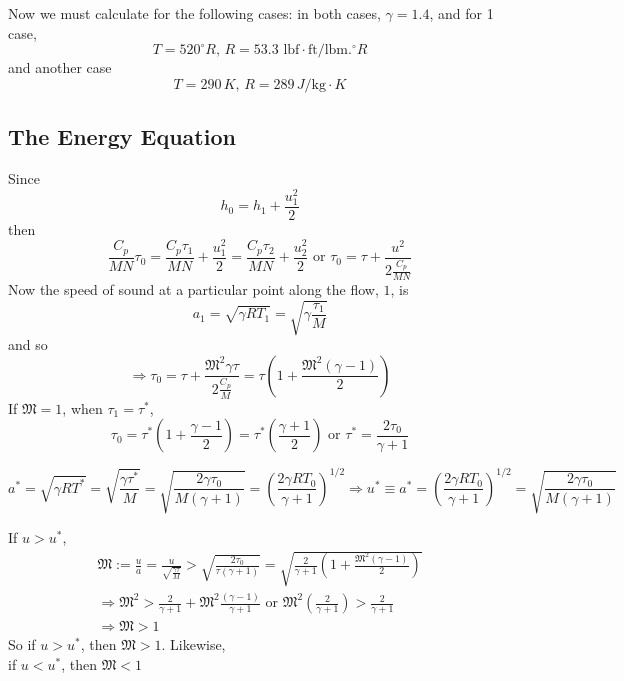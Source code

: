 \documentclass[twoside,landscape,10pt]{amsart}
\theoremstyle{plain}
\theoremstyle{definition}
\theoremstyle{remark}
\theoremstyle{remark}
\begin{document}
\begin{multicols*}{2}
Now we must calculate for the following cases: in both cases, $\gamma  = 1.4$, and for 1 case,
\[
T = 520^{\circ} R, \, R = 53.3 \text{ lbf} \cdot \text{ft} / \text{lbm} .^{\circ} R
\]
and another case
\[
T = 290 \, K, \, R = 289 \, J/ \text{kg} \cdot K
\]

\subsection{The Energy Equation}

Since 
\[
h_0 = h_1 + \frac{u_1^2}{2}
\]
then
\[
\frac{C_p}{MN} \tau_0 = \frac{C_p \tau_1}{MN} + \frac{u_1^2}{2} = \frac{C_p \tau_2}{MN} + \frac{u_2^2}{2} \text{ or } \tau_0 = \tau + \frac{u^2}{ 2 \frac{C_p}{MN} }
\]
Now the speed of sound at a particular point along the flow, $1$, is 
\[
a_1 = \sqrt{ \gamma RT_1 } = \sqrt{ \gamma \frac{\tau_1}{M} }
\]
and so 
\[
\Longrightarrow \tau_0 = \tau + \frac{ \mathfrak{M}^2 \gamma \tau }{ 2 \frac{C_p}{M}} = \tau \left( 1 + \frac{ \mathfrak{M}^2 (\gamma-1) }{2} \right)
\]
If $\mathfrak{M}=1$, when $\tau_1=\tau^*$, 
\[
\tau_0 = \tau^* \left( 1 + \frac{\gamma -1}{2} \right) = \tau^* \left( \frac{\gamma + 1 }{2} \right)
\text{ or } \tau^* = \frac{ 2\tau_0 }{ \gamma + 1 } 
\]

\begin{equation}\label{Eq:criticalvelocity}
a^* = \sqrt{ \gamma R T^*} = \sqrt{ \frac{\gamma \tau^* }{M} } = \sqrt{ \frac{2\gamma \tau_0 }{ M(\gamma + 1 ) } } = \left( \frac{2\gamma R T_0 }{\gamma + 1 } \right)^{1/2} \Longrightarrow u^* \equiv a^*  = \left( \frac{2\gamma RT_0 }{ \gamma + 1 } \right)^{1/2} = \sqrt{ \frac{2\gamma \tau_0}{M(\gamma +1) } }
\end{equation}

If $u > u^*$, 
\[
\begin{gathered}
  \mathfrak{M} := \frac{u}{a} = \frac{u}{ \sqrt{ \frac{ \gamma \tau }{ M } } } > \sqrt{ \frac{ 2\tau_0}{ \tau (\gamma + 1 ) } } = \sqrt{ \frac{2}{\gamma +1 } (1 + \frac{ \mathfrak{M}^2(\gamma - 1) }{2}  ) } \\ 
  \Longrightarrow \mathfrak{M}^2 > \frac{2}{\gamma +1 } + \mathfrak{M}^2 \frac{ (\gamma - 1) }{ \gamma + 1 } \text{ or } \mathfrak{M}^2 \left( \frac{2}{\gamma + 1} \right) > \frac{2}{\gamma +1 } \\
  \Longrightarrow \mathfrak{M} > 1
\end{gathered}
\]
So if $u > u^*$, then $\mathfrak{M}>1$.  Likewise, \\
\phantom{So } if $u < u^*$, then $\mathfrak{M}<1$


\end{multicols*}
\end{document}

